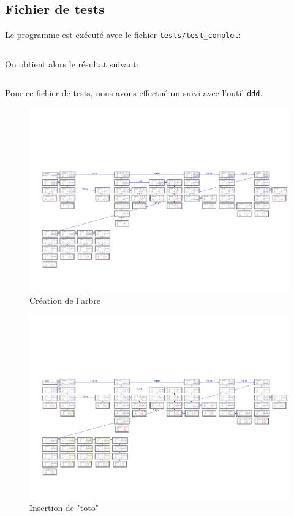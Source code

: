 \subsection{Fichier de tests}
	Le programme est exécuté avec le fichier \texttt{tests/test\_complet}:
	\inputminted[frame=single,label=Test]{text}{../tests/test_complet}
	On obtient alors le résultat suivant: 
	\begin{multicols}{2}
	\inputminted[breaklines=true,frame=single,label=Resultat]{text}{../tests/resultat_test_complet}
	\end{multicols}

	Pour ce fichier de tests, nous avons effectué un suivi avec l'outil \texttt{ddd}.
	\begin{figure}[H]
		\centering \includegraphics[angle=90,scale=0.82,trim=1cm 0cm 0cm 5cm,clip=true]{../tests/ddd_creation}
		\caption{Création de l'arbre}
	\end{figure}
	\begin{figure}[H]
		\centering \includegraphics[angle=90,scale=0.82,trim=1cm 0cm 0cm 5cm,clip=true]{../tests/ddd_insertion_toto}
		\caption{Insertion de "toto"}
	\end{figure}
